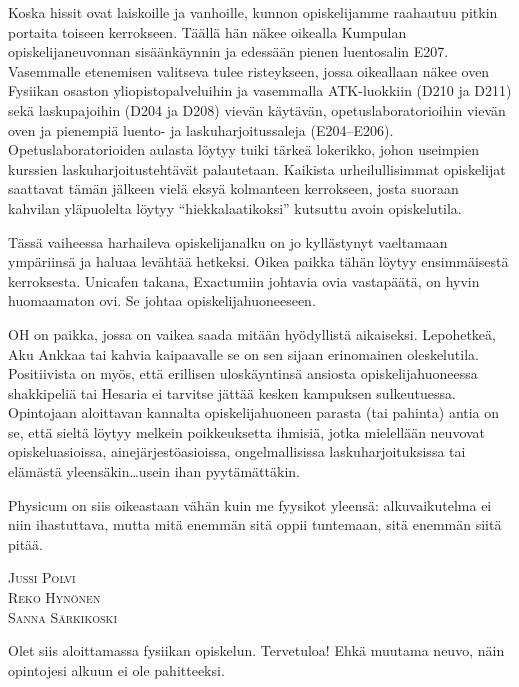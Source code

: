 \documentclass[../ala_hataile.tex]{subfiles}
\begin{document}
	Koska hissit ovat laiskoille ja vanhoille,
	kunnon opiskelijamme raahautuu pitkin
	portaita toiseen kerrokseen. Täällä hän näkee
	oikealla Kumpulan opiskelijaneuvonnan sisäänkäynnin ja edessään pienen
	luentosalin E207. Vasemmalle etenemisen
	valitseva tulee risteykseen, jossa oikeallaan
	näkee oven Fysiikan osaston yliopistopalveluihin ja
	vasemmalla ATK-luokkiin (D210 ja D211) sekä laskupajoihin (D204 ja D208) vievän käytävän, opetuslaboratorioihin vievän oven ja
	pienempiä luento- ja laskuharjoitussaleja
	(E204--E206). Opetuslaboratorioiden aulasta
	löytyy tuiki tärkeä lokerikko, johon
	useimpien kurssien laskuharjoitustehtävät
	palautetaan. Kaikista urheilullisimmat opiskelijat saattavat tämän jälkeen vielä eksyä kolmanteen kerrokseen, josta suoraan kahvilan yläpuolelta löytyy ``hiekkalaatikoksi'' kutsuttu avoin opiskelutila.
	
	Tässä vaiheessa harhaileva opiskelijan\-alku
	on jo kyllästynyt vaeltamaan ympäriinsä
	ja haluaa levähtää hetkeksi. Oikea
	paikka tähän löytyy ensimmäisestä kerroksesta.
	Unicafen takana, Exactumiin johtavia
	ovia vastapäätä, on hyvin huomaamaton
	ovi. Se johtaa opiskelija\-huoneeseen.
	
	OH on paikka, jossa on vaikea saada mitään
	hyödyllistä aikaiseksi. Lepohetkeä,
	Aku Ankkaa tai kahvia kaipaavalle se on
	sen sijaan erinomainen oleskelutila. Positiivista
	on myös, että erillisen uloskäyntinsä
	ansiosta opiskelija\-huoneessa
	shakkipeliä tai Hesaria ei tarvitse jättää kesken
	kampuksen sulkeutuessa. Opintojaan aloittavan
	kannalta opiskelija\-huoneen parasta
	(tai pahinta) antia on se, että sieltä löytyy
	melkein poikkeuksetta ihmisiä, jotka mielellään
	neuvovat opiskeluasioissa, ainejärjestöasioissa,
	ongelmallisissa laskuharjoituksissa
	tai elämästä yleensäkin\dots usein
	ihan pyytämättäkin.
	
	Physicum on siis oikeastaan vähän kuin
	me fyysikot yleensä: alkuvaikutelma ei
	niin ihastuttava, mutta mitä enemmän sitä
	oppii tuntemaan, sitä enemmän siitä pitää.
	
	\vspace{0.5cm}
	\noindent\textsc{Jussi Polvi}\\
	\textsc{Reko Hynönen}\\
	\textsc{Sanna Särkikoski}
	
	Olet siis aloittamassa fysiikan opiskelun.
	Tervetuloa! Ehkä muutama neuvo,
	näin opintojesi alkuun ei ole pahitteeksi.
	
\end{document}
